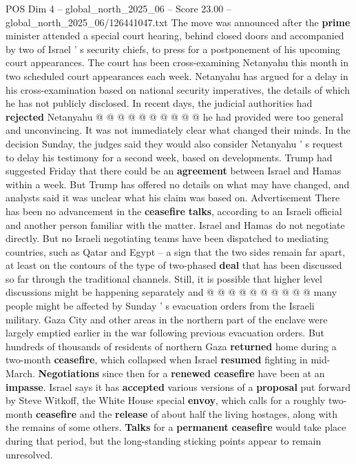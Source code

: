 \begin{textsample}{POS Dim 4 – global\_north\_2025\_06 – Score 23.00 – global\_north\_2025\_06/126441047.txt}
The move was announced after the \textbf{prime} minister attended a special court hearing, behind closed doors and accompanied by two of Israel ' s security chiefs, to press for a postponement of his upcoming court appearances.
The court has been cross-examining Netanyahu this month in two scheduled court appearances each week.
Netanyahu has argued for a delay in his cross-examination based on national security imperatives, the details of which he has not publicly disclosed.
In recent days, the judicial authorities had \textbf{rejected} Netanyahu @ @ @ @ @ @ @ @ @ @ he had provided were too general and unconvincing.
It was not immediately clear what changed their minds.
In the decision Sunday, the judges said they would also consider Netanyahu ' s request to delay his testimony for a second week, based on developments.
Trump had suggested Friday that there could be an \textbf{agreement} between Israel and Hamas within a week.
But Trump has offered no details on what may have changed, and analysts said it was unclear what his claim was based on.
Advertisement There has been no advancement in the \textbf{ceasefire} \textbf{talks}, according to an Israeli official and another person familiar with the matter.
Israel and Hamas do not negotiate directly.
But no Israeli negotiating teams have been dispatched to mediating countries, such as Qatar and Egypt -- a sign that the two sides remain far apart, at least on the contours of the type of two-phased \textbf{deal} that has been discussed so far through the traditional channels.
Still, it is possible that higher level discussions might be happening separately and @ @ @ @ @ @ @ @ @ @ many people might be affected by Sunday ' s evacuation orders from the Israeli military.
Gaza City and other areas in the northern part of the enclave were largely emptied earlier in the war following previous evacuation orders.
But hundreds of thousands of residents of northern Gaza \textbf{returned} home during a two-month \textbf{ceasefire}, which collapsed when Israel \textbf{resumed} fighting in mid-March. \textbf{Negotiations} since then for a \textbf{renewed} \textbf{ceasefire} have been at an \textbf{impasse}.
Israel says it has \textbf{accepted} various versions of a \textbf{proposal} put forward by Steve Witkoff, the White House special \textbf{envoy}, which calls for a roughly two-month \textbf{ceasefire} and the \textbf{release} of about half the living hostages, along with the remains of some others. \textbf{Talks} for a \textbf{permanent} \textbf{ceasefire} would take place during that period, but the long-standing sticking points appear to remain unresolved.

\end{textsample}

